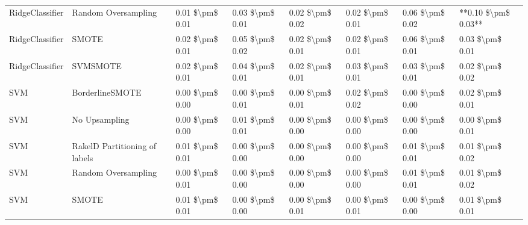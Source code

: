 \begin{tabular}{llllllll}
                RidgeClassifier &           Random Oversampling & 0.01 \$\textbackslash pm\$ 0.01 &           0.03 \$\textbackslash pm\$ 0.01 &       0.02 \$\textbackslash pm\$ 0.02 &        0.02 \$\textbackslash pm\$ 0.01 &                         0.06 \$\textbackslash pm\$ 0.02 & **0.10 \$\textbackslash pm\$ 0.03** \\
                RidgeClassifier &                         SMOTE & 0.02 \$\textbackslash pm\$ 0.01 &           0.05 \$\textbackslash pm\$ 0.02 &       0.02 \$\textbackslash pm\$ 0.01 &        0.02 \$\textbackslash pm\$ 0.01 &                         0.06 \$\textbackslash pm\$ 0.01 &     0.03 \$\textbackslash pm\$ 0.01 \\
                RidgeClassifier &                      SVMSMOTE & 0.02 \$\textbackslash pm\$ 0.01 &           0.04 \$\textbackslash pm\$ 0.01 &       0.02 \$\textbackslash pm\$ 0.01 &        0.03 \$\textbackslash pm\$ 0.01 &                         0.03 \$\textbackslash pm\$ 0.01 &     0.02 \$\textbackslash pm\$ 0.02 \\
                            SVM &               BorderlineSMOTE & 0.00 \$\textbackslash pm\$ 0.00 &           0.00 \$\textbackslash pm\$ 0.01 &       0.00 \$\textbackslash pm\$ 0.01 &        0.02 \$\textbackslash pm\$ 0.02 &                         0.00 \$\textbackslash pm\$ 0.00 &     0.02 \$\textbackslash pm\$ 0.01 \\
                            SVM &                 No Upsampling & 0.00 \$\textbackslash pm\$ 0.00 &           0.01 \$\textbackslash pm\$ 0.01 &       0.00 \$\textbackslash pm\$ 0.00 &        0.00 \$\textbackslash pm\$ 0.00 &                         0.00 \$\textbackslash pm\$ 0.00 &     0.00 \$\textbackslash pm\$ 0.01 \\
                            SVM & RakelD Partitioning of labels & 0.01 \$\textbackslash pm\$ 0.01 &           0.00 \$\textbackslash pm\$ 0.00 &       0.00 \$\textbackslash pm\$ 0.00 &        0.00 \$\textbackslash pm\$ 0.00 &                         0.01 \$\textbackslash pm\$ 0.01 &     0.01 \$\textbackslash pm\$ 0.02 \\
                            SVM &           Random Oversampling & 0.00 \$\textbackslash pm\$ 0.01 &           0.00 \$\textbackslash pm\$ 0.00 &       0.00 \$\textbackslash pm\$ 0.00 &        0.00 \$\textbackslash pm\$ 0.00 &                         0.01 \$\textbackslash pm\$ 0.01 &     0.01 \$\textbackslash pm\$ 0.02 \\
                            SVM &                         SMOTE & 0.01 \$\textbackslash pm\$ 0.01 &           0.00 \$\textbackslash pm\$ 0.00 &       0.00 \$\textbackslash pm\$ 0.01 &        0.00 \$\textbackslash pm\$ 0.01 &                         0.00 \$\textbackslash pm\$ 0.00 &     0.01 \$\textbackslash pm\$ 0.01 \\

\end{tabular}
